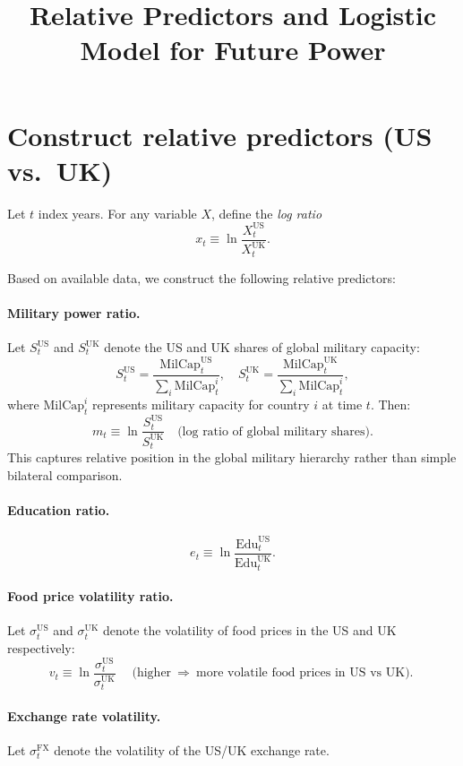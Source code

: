 \documentclass[11pt]{article}
\title{Relative Predictors and Logistic Model for Future Power}
\date{}
\newcommand{\US}{\mathrm{US}}
\newcommand{\UK}{\mathrm{UK}}
\begin{document}
\maketitle
\vspace{-1.5em}

\section{Construct relative predictors (US vs.\ UK)}

Let $t$ index years. For any variable $X$, define the \emph{log ratio}
\[
x_t \equiv \ln\!\frac{X_t^{\US}}{X_t^{\UK}}.
\]

Based on available data, we construct the following relative predictors:

\paragraph{Military power ratio.}
Let $S^{\US}_t$ and $S^{\UK}_t$ denote the US and UK shares of global military capacity:
\[
S^{\US}_t = \frac{\mathrm{MilCap}^{\US}_t}{\sum_{i} \mathrm{MilCap}^i_t}, \quad
S^{\UK}_t = \frac{\mathrm{MilCap}^{\UK}_t}{\sum_{i} \mathrm{MilCap}^i_t},
\]
where $\mathrm{MilCap}^i_t$ represents military capacity for country $i$ at time $t$. Then:
\[
m_t \equiv \ln\!\frac{S^{\US}_t}{S^{\UK}_t}
\quad\text{(log ratio of global military shares).}
\]
This captures relative position in the global military hierarchy rather than simple bilateral comparison.

\paragraph{Education ratio.}
\[
e_t \equiv \ln\!\frac{\mathrm{Edu}^{\US}_t}{\mathrm{Edu}^{\UK}_t}.
\]

\paragraph{Food price volatility ratio.}
Let $\sigma^{\US}_t$ and $\sigma^{\UK}_t$ denote the volatility of food prices in the US and UK respectively:
\[
v_t \equiv \ln\!\frac{\sigma^{\US}_t}{\sigma^{\UK}_t}
\quad\text{(higher $\,\Rightarrow\,$ more volatile food prices in US vs UK).}
\]

\paragraph{Exchange rate volatility.}
Let $\sigma^{\text{FX}}_t$ denote the volatility of the US/UK exchange rate.
\end{document}
